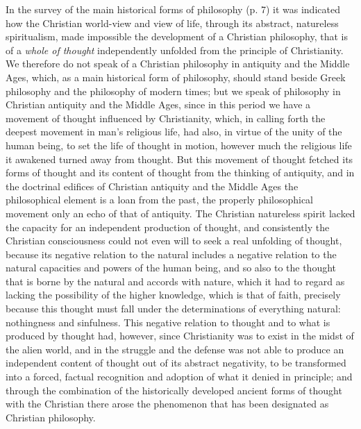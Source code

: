 \divrule

In the survey of the main historical forms of philosophy (p. 7) it was indicated how the Christian world-view and view of life, through its abstract, natureless spiritualism, made impossible the development of a Christian philosophy, that is of a \emph{whole of thought} independently unfolded from the principle of Christianity. We therefore do not speak of a Christian philosophy in antiquity and the Middle Ages, which, as a main historical form of philosophy, should stand beside Greek philosophy and the philosophy of modern times; but we speak of philosophy in Christian antiquity and the Middle Ages, since in this period we have a movement of thought influenced by Christianity, which, in calling forth the deepest movement in man's religious life, had also, in virtue of the unity of the human being, to set the life of thought in motion, however much the religious life it awakened turned away from thought. But this movement of thought fetched its forms of thought and its content of thought from the thinking of antiquity, and in the doctrinal edifices of Christian antiquity and the Middle Ages the philosophical element is a loan from the past, the properly philosophical movement only an echo of that of antiquity. The Christian natureless spirit lacked the capacity for an independent production of thought, and consistently the Christian consciousness could not even will to seek a real unfolding of thought, because its negative relation to the natural includes a negative relation to the natural capacities and powers of the human being, and so also to the thought that is borne by the natural and accords with nature, which it had to regard as lacking the possibility of the higher knowledge, which is that of faith, precisely because this thought must fall under the determinations of everything natural: nothingness and sinfulness. This negative relation to thought and to what is produced by thought had, however, since Christianity was to exist in the midst of the alien world, and in the struggle and the defense was not able to produce an independent content of thought out of its abstract negativity, to be transformed into a forced, factual recognition and adoption of what it denied in principle; and through the combination of the historically developed ancient forms of thought with the Christian there arose the phenomenon that has been designated as Christian philosophy.

